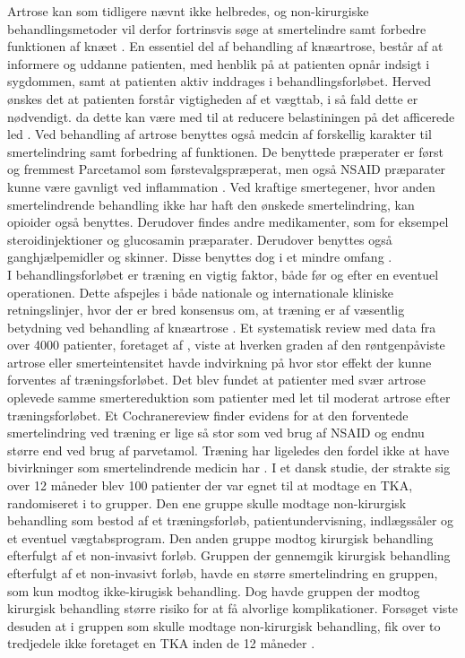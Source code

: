 Artrose kan som tidligere nævnt ikke helbredes, og non-kirurgiske behandlingsmetoder vil derfor fortrinsvis søge at smertelindre samt forbedre funktionen af knæet \citep{brostrom2012}. En essentiel del af behandling af knæartrose, består af at informere og uddanne patienten, med henblik på at patienten opnår indsigt i sygdommen, samt at patienten aktiv inddrages i behandlingsforløbet. Herved ønskes det at patienten forstår vigtigheden af et vægttab, i så fald dette er nødvendigt. da dette kan være med til at reducere belastiningen på det afficerede led \citep{brostrom2012}.
Ved behandling af artrose benyttes også medcin af forskellig karakter til smertelindring samt forbedring af funktionen. De benyttede præperater er først og fremmest Parcetamol som  førstevalgspræperat, men også NSAID præparater kunne være gavnligt ved inflammation \citep{schroder}. Ved kraftige smertegener, hvor anden smertelindrende behandling ikke har haft den ønskede smertelindring, kan opioider også benyttes. Derudover findes andre medikamenter, som for eksempel steroidinjektioner og glucosamin præparater. Derudover benyttes også ganghjælpemidler og skinner. Disse benyttes dog i et mindre omfang \citep{brostrom2012}.\\

I behandlingsforløbet er træning en vigtig faktor, både før og efter en eventuel operationen. Dette afspejles i både nationale og internationale kliniske retningslinjer, hvor der er bred konsensus om, at træning er af væsentlig betydning ved behandling af knæartrose \citep{brostrom2012}. Et systematisk review med data fra over 4000 patienter, foretaget af \cite{Syssorenskou}, viste at hverken graden af den røntgenpåviste artrose eller smerteintensitet havde indvirkning på hvor stor effekt der kunne forventes af træningsforløbet. Det blev fundet at patienter med svær artrose oplevede samme smertereduktion som patienter med let til moderat artrose efter træningsforløbet. Et Cochranereview finder evidens for at den forventede smertelindring ved træning er lige så stor som ved brug af NSAID og endnu større end ved brug af parvetamol. Træning har ligeledes den fordel ikke at have bivirkninger som smertelindrende medicin har \citep{sorenskou}.
I et dansk studie, der strakte sig over 12 måneder blev 100 patienter  der var egnet til at modtage en TKA, randomiseret i to grupper. Den ene gruppe skulle modtage non-kirurgisk behandling som bestod af et træningsforløb, patientundervisning, indlægssåler og et eventuel vægtabsprogram. Den anden gruppe modtog kirurgisk behandling efterfulgt af et non-invasivt forløb. Gruppen der gennemgik kirurgisk behandling efterfulgt af et non-invasivt forløb, havde en større smertelindring en gruppen, som kun modtog ikke-kirugisk behandling. Dog havde gruppen der modtog kirurgisk behandling større risiko for at få alvorlige komplikationer. Forsøget viste desuden at i gruppen som skulle modtage non-kirurgisk behandling, fik over to tredjedele ikke foretaget en TKA inden de 12 måneder \citep{newEngland}. 

